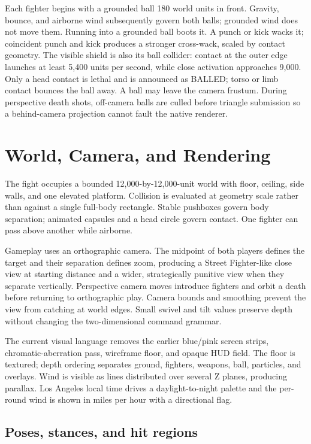 \documentclass[10pt,letterpaper,twocolumn]{article}
\begin{document}
Each fighter begins with a grounded ball 180 world units in front. Gravity, bounce, and airborne wind subsequently govern both balls; grounded wind does not move them. Running into a grounded ball boots it. A punch or kick wacks it; coincident punch and kick produces a stronger cross-wack, scaled by contact geometry. The visible shield is also its ball collider: contact at the outer edge launches at least 5,400 units per second, while close activation approaches 9,000. Only a head contact is lethal and is announced as \textsc{BALLED}; torso or limb contact bounces the ball away. A ball may leave the camera frustum. During perspective death shots, off-camera balls are culled before triangle submission so a behind-camera projection cannot fault the native renderer.

\section{World, Camera, and Rendering}

The fight occupies a bounded 12,000-by-12,000-unit world with floor, ceiling, side walls, and one elevated platform. Collision is evaluated at geometry scale rather than against a single full-body rectangle. Stable pushboxes govern body separation; animated capsules and a head circle govern contact. One fighter can pass above another while airborne.

Gameplay uses an orthographic camera. The midpoint of both players defines the target and their separation defines zoom, producing a Street Fighter-like close view at starting distance and a wider, strategically punitive view when they separate vertically. Perspective camera moves introduce fighters and orbit a death before returning to orthographic play. Camera bounds and smoothing prevent the view from catching at world edges. Small swivel and tilt values preserve depth without changing the two-dimensional command grammar.

The current visual language removes the earlier blue/pink screen strips, chromatic-aberration pass, wireframe floor, and opaque HUD field. The floor is textured; depth ordering separates ground, fighters, weapons, ball, particles, and overlays. Wind is visible as lines distributed over several Z planes, producing parallax. Los Angeles local time drives a daylight-to-night palette and the per-round wind is shown in miles per hour with a directional flag.

\subsection{Poses, stances, and hit regions}
\end{document}
